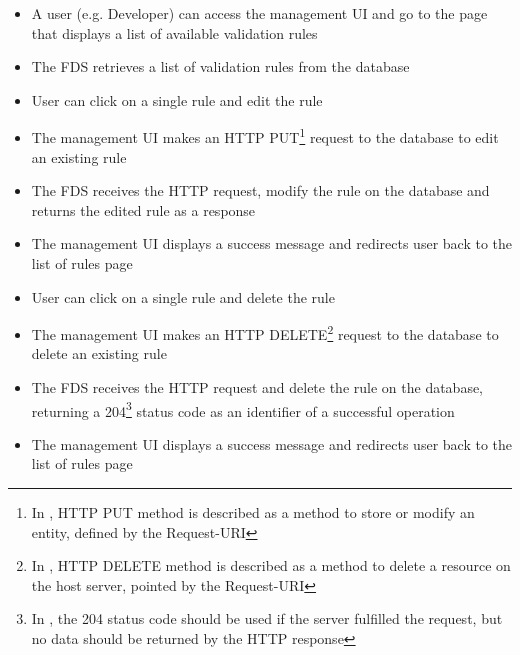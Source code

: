 \begin{itemize}
 \item A user (e.g. Developer) can access the management UI and go to the page that displays a list of available validation rules
 \item The FDS retrieves a list of validation rules from the database
 \item User can click on a single rule and edit the rule
 \item The management UI makes an HTTP PUT\footnote{In \autocite[\enquote{9.6 PUT}]{http-rfc}, HTTP PUT method is described as a method to store or modify an entity, defined by the Request-URI} request to the database to edit an existing rule
 \item The FDS receives the HTTP request, modify the rule on the database and returns the edited rule as a response
 \item The management UI displays a success message and redirects user back to the list of rules page
 \item User can click on a single rule and delete the rule
 \item The management UI makes an HTTP DELETE\footnote{In \autocite[\enquote{9.7 DELETE}]{http-rfc}, HTTP DELETE method is described as a method to delete a resource on the host server, pointed by the Request-URI} request to the database to delete an existing rule
 \item The FDS receives the HTTP request and delete the rule on the database, returning a 204\footnote{In \autocite[\enquote{10.2.5 204 No Content}]{http-rfc}, the 204 status code should be used if the server fulfilled the request, but no data should be returned by the HTTP response} status code as an identifier of a successful operation
 \item The management UI displays a success message and redirects user back to the list of rules page
\end{itemize} 